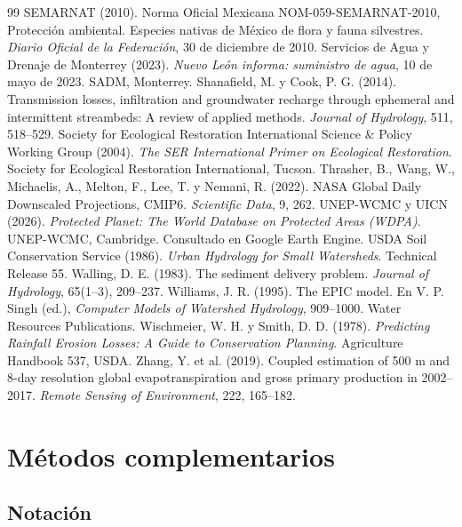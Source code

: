 \documentclass[11pt,letterpaper]{article}
\begin{document}
\begin{thebibliography}{99}
 SEMARNAT (2010). Norma Oficial Mexicana NOM-059-SEMARNAT-2010, Protección ambiental. Especies nativas de México de flora y fauna silvestres. \emph{Diario Oficial de la Federación}, 30 de diciembre de 2010.
 Servicios de Agua y Drenaje de Monterrey (2023). \emph{Nuevo León informa: suministro de agua}, 10 de mayo de 2023. SADM, Monterrey.
 Shanafield, M. y Cook, P. G. (2014). Transmission losses, infiltration and groundwater recharge through ephemeral and intermittent streambeds: A review of applied methods. \emph{Journal of Hydrology}, 511, 518–529.
 Society for Ecological Restoration International Science \& Policy Working Group (2004). \emph{The SER International Primer on Ecological Restoration}. Society for Ecological Restoration International, Tucson.
 Thrasher, B., Wang, W., Michaelis, A., Melton, F., Lee, T. y Nemani, R. (2022). NASA Global Daily Downscaled Projections, CMIP6. \emph{Scientific Data}, 9, 262.
 UNEP-WCMC y UICN (2026). \emph{Protected Planet: The World Database on Protected Areas (WDPA)}. UNEP-WCMC, Cambridge. Consultado en Google Earth Engine.
 USDA Soil Conservation Service (1986). \emph{Urban Hydrology for Small Watersheds}. Technical Release 55.
 Walling, D. E. (1983). The sediment delivery problem. \emph{Journal of Hydrology}, 65(1–3), 209–237.
 Williams, J. R. (1995). The EPIC model. En V. P. Singh (ed.), \emph{Computer Models of Watershed Hydrology}, 909–1000. Water Resources Publications.
 Wischmeier, W. H. y Smith, D. D. (1978). \emph{Predicting Rainfall Erosion Losses: A Guide to Conservation Planning}. Agriculture Handbook 537, USDA.
 Zhang, Y. et al. (2019). Coupled estimation of 500 m and 8-day resolution global evapotranspiration and gross primary production in 2002–2017. \emph{Remote Sensing of Environment}, 222, 165–182.
\end{thebibliography}

\appendix
\section{Métodos complementarios}\label{ap:metodos}

\subsection{Notación}\label{ap:notacion}
\end{document}
